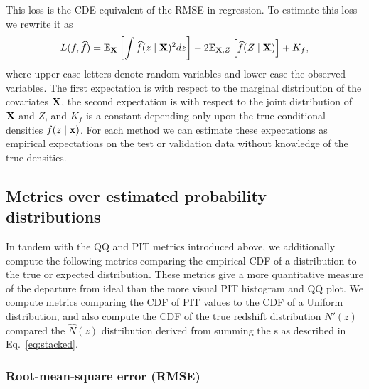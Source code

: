 This loss is the CDE equivalent of the RMSE in regression.
To estimate this loss we rewrite it as
\begin{equation} \label{eq:estimated-cde-loss}
L(f, \widehat{f}) = \mathbb{E}_{\mathbf{X}} \left[\int \widehat{f}(z \mid {\mathbf{X}})^{2} dz\right] - 2 \mathbb{E}_{{\mathbf{X}},Z}\left[\widehat{f}(Z \mid {\mathbf{X}})\right] + K_{f},
\end{equation}
where upper-case letters denote random variables and lower-case the observed variables.  The first expectation is with respect to the marginal distribution of the covariates ${\mathbf{X}}$, the second expectation is with respect to the joint distribution of ${\mathbf{X}}$ and $Z$, and $K_{f}$ is a constant depending only upon the true conditional densities $f(z\mid {\mathbf{x}})$.
For each method we can estimate these expectations as empirical expectations on the test or validation data \citep[Eq.~7 in][]{Izbicki:17b} without knowledge of the true densities.


\subsection{Metrics over estimated probability distributions}
\label{sec:quantmet}

In tandem with the QQ and PIT metrics introduced above, we additionally compute the following metrics comparing the empirical CDF of a distribution to the true or expected distribution.
These metrics give a more quantitative measure of the departure from ideal than the more visual PIT histogram and QQ plot.
We compute metrics comparing the CDF of PIT values to the CDF of a Uniform distribution, and also compute the CDF of the true redshift distribution $N'(z)$ compared the $\hat{N}(z)$ distribution derived from summing the \pzpdf s as described in Eq.~\ref{eq:stacked}.

\subsubsection{Root-mean-square error (RMSE)}
\label{sec:rmse}


